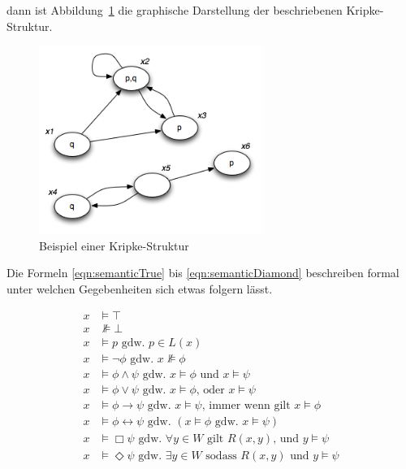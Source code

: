 dann ist Abbildung~\ref{fig:mmKripke01} die graphische Darstellung der beschriebenen Kripke-Struktur.

\begin{figure}[ht]
	\begin{center}
  	\includegraphics[width=0.65\textwidth]{./Images/Kripke01.png}
  	\caption{Beispiel einer Kripke-Struktur}
		\label{fig:mmKripke01}
	\end{center}
\end{figure}


Die Formeln \eqref{eqn:semanticTrue} bis \eqref{eqn:semanticDiamond} beschreiben formal unter welchen Gegebenheiten sich etwas folgern lässt.

\begin{align}
	x &\vDash \top\label{eqn:semanticTrue}\\
	x &\nVDash \bot\label{eqn:semanticFalse}\\
	x &\vDash p\text{ gdw. }p \in L(x)\label{eqn:semanticLabel}\\
	x &\vDash \neg \phi\text{ gdw. }x \nVDash \phi\\
	x &\vDash \phi \wedge \psi\text{ gdw. }x \vDash \phi\text{ und } x \vDash \psi\label{eqn:semanticAnd}\\
	x &\vDash \phi \vee \psi\text{ gdw. }x \vDash \phi \text{, oder } x \vDash \psi\\
	x &\vDash \phi \rightarrow \psi\text{ gdw. }x \vDash \psi\text{, immer wenn gilt }x \vDash \phi\\
	x &\vDash \phi \leftrightarrow \psi\text{ gdw. }( x \vDash \phi\text{ gdw. }x \vDash \psi)\label{eqn:semanticBiconditional}\\
	x &\vDash \Box \psi \text{ gdw. }\forall y \in W \text{ gilt } R(x,y)\text{, und } y \vDash \psi\label{eqn:semanticBox}\\
	x &\vDash \Diamond \psi\text{ gdw. }\exists y \in W \text{ sodass }R(x,y)\text{ und }y \vDash \psi\label{eqn:semanticDiamond}
\end{align}

